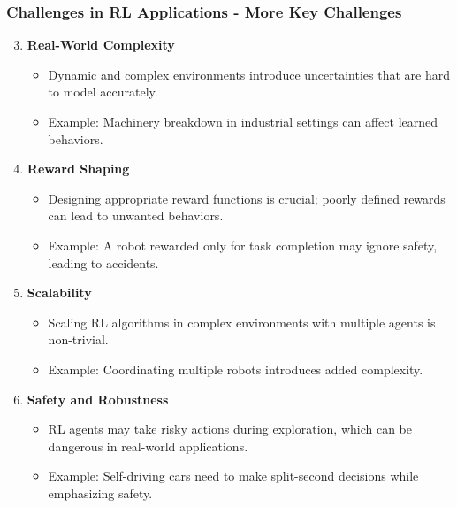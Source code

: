 \documentclass[aspectratio=169]{beamer}
\begin{document}
\begin{frame}[fragile]
    \frametitle{Challenges in RL Applications - More Key Challenges}
    \begin{enumerate}
        \setcounter{enumi}{2} %
        
        \item \textbf{Real-World Complexity}
            \begin{itemize}
                \item Dynamic and complex environments introduce uncertainties that are hard to model accurately.
                \item Example: Machinery breakdown in industrial settings can affect learned behaviors.
            \end{itemize}
        
        \item \textbf{Reward Shaping}
            \begin{itemize}
                \item Designing appropriate reward functions is crucial; poorly defined rewards can lead to unwanted behaviors.
                \item Example: A robot rewarded only for task completion may ignore safety, leading to accidents.
            \end{itemize}
        
        \item \textbf{Scalability}
            \begin{itemize}
                \item Scaling RL algorithms in complex environments with multiple agents is non-trivial.
                \item Example: Coordinating multiple robots introduces added complexity.
            \end{itemize}
        
        \item \textbf{Safety and Robustness}
            \begin{itemize}
                \item RL agents may take risky actions during exploration, which can be dangerous in real-world applications.
                \item Example: Self-driving cars need to make split-second decisions while emphasizing safety.
            \end{itemize}
    \end{enumerate}
\end{frame}
\end{document}
